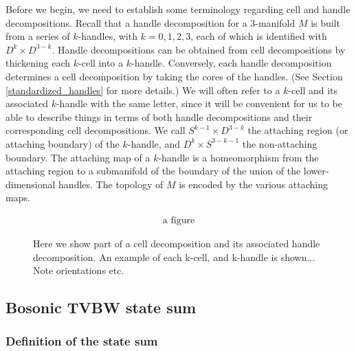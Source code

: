 Before we begin, we need to establish some terminology regarding cell and handle decompositions. 
Recall that a handle decomposition for a 
3-manifold $M$ is built from a series of $k$-handles, with $k=0,1,2,3$, each of which is identified with $D^k\times D^{3-k}$. 
Handle decompositions can be obtained from cell decompositions by thickening each $k$-cell into a $k$-handle.
Conversely, each handle decomposition determines a cell decomposition by taking the cores of the handles.
(See Section \ref{standardized_handles} for more details.)
We will often refer to a $k$-cell and its associated $k$-handle with the same letter, since
it will be convenient for us to be able to describe things in terms of both handle decompositions 
and their corresponding cell decompositions. 
We call $S^{k-1} \times D^{3-k}$ the attaching region (or attaching boundary) of the $k$-handle,
and $D^k\times S^{3-k-1}$ the non-attaching boundary.
The attaching map of a $k$-handle is a homeomorphism from the attaching region to 
a submanifold of the boundary of the union of the lower-dimensional handles.
The topology of $M$ is encoded by the various attaching maps.
\begin{figure}
\begin{align}
\text{a figure} 
\end{align}
\caption{
\label{cell_and_handle_decomp}
Here we show part of a cell decomposition and its associated handle decomposition. 
An example of each k-cell, and k-handle is shown...
Note orientations etc.
}
\end{figure}




\subsection{Bosonic TVBW state sum}

\subsubsection{Definition of the state sum}


